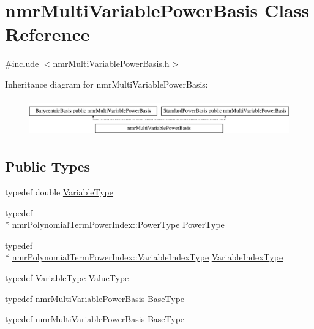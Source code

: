 \hypertarget{classnmr_multi_variable_power_basis}{\section{nmr\-Multi\-Variable\-Power\-Basis Class Reference}
\label{classnmr_multi_variable_power_basis}
}


{\ttfamily \#include $<$nmr\-Multi\-Variable\-Power\-Basis.\-h$>$}

Inheritance diagram for nmr\-Multi\-Variable\-Power\-Basis\-:\begin{figure}[H]
\begin{center}
\leavevmode
\includegraphics[height=1.632653cm]{dc/d0d/classnmr_multi_variable_power_basis}
\end{center}
\end{figure}
\subsection*{Public Types}
\begin{DoxyCompactItemize}
\item 
typedef double \hyperlink{classnmr_multi_variable_power_basis_a7089007a79cce8d2eb3672e2d61af06c}{Variable\-Type}
\item 
typedef \\*
\hyperlink{classnmr_polynomial_term_power_index_a2eec01c3a2c3f56f47982ceffd8e36ed}{nmr\-Polynomial\-Term\-Power\-Index\-::\-Power\-Type} \hyperlink{classnmr_multi_variable_power_basis_a2cb67df83e9fcac213848fa7a7295fcc}{Power\-Type}
\item 
typedef \\*
\hyperlink{classnmr_polynomial_term_power_index_ac982d5f82c3a95968e92d54c92cbc3e0}{nmr\-Polynomial\-Term\-Power\-Index\-::\-Variable\-Index\-Type} \hyperlink{classnmr_multi_variable_power_basis_ae125326a623043fcfd020aeeefd1cce6}{Variable\-Index\-Type}
\item 
typedef \hyperlink{classnmr_multi_variable_power_basis_a7089007a79cce8d2eb3672e2d61af06c}{Variable\-Type} \hyperlink{classnmr_multi_variable_power_basis_af4a74a68c8bac235645e3f37f2f464e5}{Value\-Type}
\item 
typedef \hyperlink{classnmr_multi_variable_power_basis}{nmr\-Multi\-Variable\-Power\-Basis} \hyperlink{classnmr_multi_variable_power_basis_aaf11c12fba7357db886d9eee2fc480b4}{Base\-Type}
\item 
typedef \hyperlink{classnmr_multi_variable_power_basis}{nmr\-Multi\-Variable\-Power\-Basis} \hyperlink{classnmr_multi_variable_power_basis_aaf11c12fba7357db886d9eee2fc480b4}{Base\-Type}
\end{DoxyCompactItemize}
